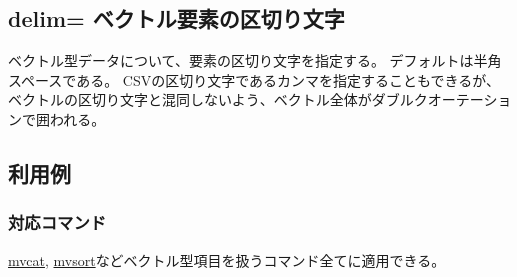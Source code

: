 
%

\subsection{delim= ベクトル要素の区切り文字\label{sect:option_delim}}
ベクトル型データについて、要素の区切り文字を指定する。
デフォルトは半角スペースである。
CSVの区切り文字であるカンマを指定することもできるが、
ベクトルの区切り文字と混同しないよう、ベクトル全体がダブルクオーテーションで囲われる。

\subsection*{利用例}


\subsubsection*{対応コマンド}
\hyperref[sect:mvcat]{mvcat},
\hyperref[sect:mvsort]{mvsort}などベクトル型項目を扱うコマンド全てに適用できる。

%

